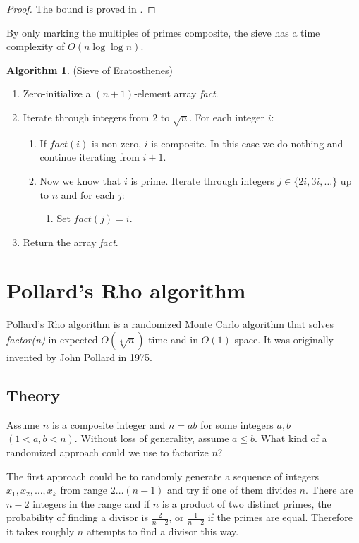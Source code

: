\documentclass[12pt] {article}
\theoremstyle{plain}
\theoremstyle{definition}
\newtheorem{algo}[thm]{Algorithm}
\begin{document}
\begin{proof}
The bound is proved in \cite{primereciprocal}.
\end{proof}

By only marking the multiples of primes composite, the sieve has a time complexity of $O(n \log{\log{n}})$.

\begin{algo} (Sieve of Eratosthenes)
\begin{enumerate}
\item Zero-initialize a $(n+1)$-element array \textit{fact}.
\item Iterate through integers from $2$ to $\sqrt{n}$. For each integer $i$:
\begin{enumerate}
	\item If $fact(i)$ is non-zero, $i$ is composite. In this case we do nothing and continue iterating from $i+1$.
	\item Now we know that $i$ is prime. Iterate through integers $j \in \{2i, 3i, \dots\}$ up to $n$ and for each $j$:
	\begin{enumerate}
		\item Set $fact(j) = i$.
	\end{enumerate}
\end{enumerate}
\item Return the array \textit{fact}.
\end{enumerate}
\end{algo}

\section {Pollard's Rho algorithm}

Pollard's Rho algorithm is a randomized Monte Carlo algorithm that solves \textit{factor(n)} in expected $O(\sqrt[4]{n})$ time and in $O(1)$ space. It was originally invented by John Pollard in 1975\cite{pollard}.

\subsection {Theory}

Assume $n$ is a composite integer and $n = ab$ for some integers $a, b$ $(1 < a, b < n)$. Without loss of generality, assume $a \leq b$. What kind of a randomized approach could we use to factorize $n$?

The first approach could be to randomly generate a sequence of integers $x_1, x_2, \dots, x_k$ from range $2 \dots (n-1)$ and try if one of them divides $n$. There are $n-2$ integers in the range and if $n$ is a product of two distinct primes, the probability of finding a divisor is $\frac{2}{n-2}$, or $\frac{1}{n-2}$ if the primes are equal. Therefore it takes roughly $n$ attempts to find a divisor this way.
\end{document}
